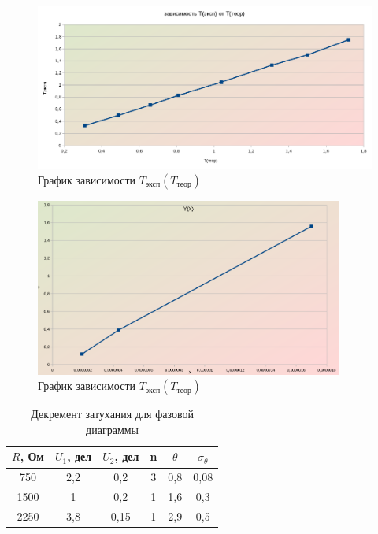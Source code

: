 \documentclass[a4paper, 12pt]{article}%
\begin{document}
\begin{figure}[h!]
\begin{center}
\includegraphics[width = 1.0\textwidth]{graph2.jpg}
\caption{График зависимости $T_{\text{эксп}}(T_{\text{теор}})$}
\end{center}
\end{figure}

\begin{figure}[h!]
\begin{center}
\includegraphics[width = 0.9\textwidth]{graph3.jpg}
\caption{График зависимости $T_{\text{эксп}}(T_{\text{теор}})$}
\end{center}
\end{figure}

\begin{table}[h!]
\begin{center}
\begin{tabular}{|c|c|c|c|c|c|}
\hline
$R$, Ом & $U_1$, дел & $U_2$, дел & n & $\theta$ & $\sigma_{\theta}$ \\ \hline
750  & 2,2  & 0,2        & 3 & 0,8    & 0,08              \\ \hline
1500 & 1    & 0,2        & 1 & 1,6    & 0,3              \\ \hline
2250 & 3,8    & 0,15     & 1 & 2,9    & 0,5              \\ \hline
\end{tabular}
\caption{Декремент затухания для фазовой диаграммы}
\end{center}
\end{table}
\end{document}
